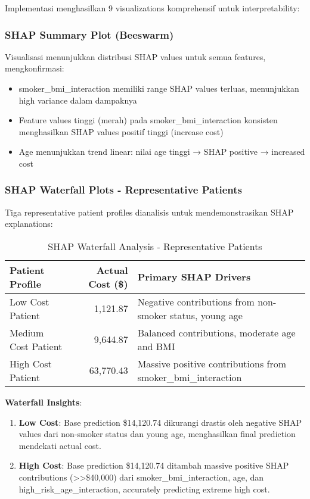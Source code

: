 Implementasi menghasilkan 9 visualizations komprehensif untuk interpretability:

\subsubsection{SHAP Summary Plot (Beeswarm)}
Visualisasi menunjukkan distribusi SHAP values untuk semua features, mengkonfirmasi:
\begin{itemize}
    \item smoker\_bmi\_interaction memiliki range SHAP values terluas, menunjukkan high variance dalam dampaknya
    \item Feature values tinggi (merah) pada smoker\_bmi\_interaction konsisten menghasilkan SHAP values positif tinggi (increase cost)
    \item Age menunjukkan trend linear: nilai age tinggi → SHAP positive → increased cost
\end{itemize}

\subsubsection{SHAP Waterfall Plots - Representative Patients}

Tiga representative patient profiles dianalisis untuk mendemonstrasikan SHAP explanations:

\begin{table}[H]
\centering
\caption{SHAP Waterfall Analysis - Representative Patients}
\label{tab:shap-waterfall-patients}
\begin{tabular}{|l|r|l|}
\hline
\textbf{Patient Profile} & \textbf{Actual Cost (\$)} & \textbf{Primary SHAP Drivers} \\
\hline
Low Cost Patient & 1,121.87 & Negative contributions from non-smoker status, young age \\
Medium Cost Patient & 9,644.87 & Balanced contributions, moderate age and BMI \\
High Cost Patient & 63,770.43 & Massive positive contributions from smoker\_bmi\_interaction \\
\hline
\end{tabular}
\end{table}

\textbf{Waterfall Insights}:
\begin{enumerate}
    \item \textbf{Low Cost}: Base prediction \$14,120.74 dikurangi drastis oleh negative SHAP values dari non-smoker status dan young age, menghasilkan final prediction mendekati actual cost.

    \item \textbf{High Cost}: Base prediction \$14,120.74 ditambah massive positive SHAP contributions (>>\$40,000) dari smoker\_bmi\_interaction, age, dan high\_risk\_age\_interaction, accurately predicting extreme high cost.
\end{enumerate}

